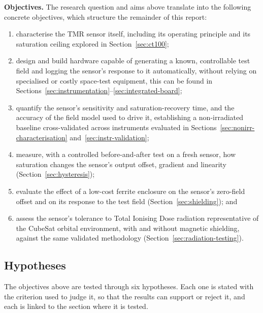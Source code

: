 \documentclass[12pt,a4paper]{article}
\begin{document}
\textbf{Objectives.} The research question and aims above translate into the following concrete objectives, which structure the remainder of this report:
\begin{enumerate}[label=(\roman*)]
\item characterise the TMR sensor itself, including its operating principle and its saturation ceiling explored in Section~\ref{sec:ct100};
\item design and build hardware capable of generating a known, controllable test field and logging the sensor's response to it automatically, without relying on specialised or costly space-test equipment, this can be found in Sections~\ref{sec:instrumentation}--\ref{sec:integrated-board};
\item quantify the sensor's sensitivity and saturation-recovery time, and the accuracy of the field model used to drive it, establishing a non-irradiated baseline cross-validated across instruments evaluated in Sections~\ref{sec:nonirr-characterisation} and~\ref{sec:instr-validation};
\item measure, with a controlled before-and-after test on a fresh sensor, how saturation changes the sensor's output offset, gradient and linearity (Section~\ref{sec:hysteresis});
\item evaluate the effect of a low-cost ferrite enclosure on the sensor's zero-field offset and on its response to the test field (Section~\ref{sec:shielding}); and
\item assess the sensor's tolerance to Total Ionising Dose radiation representative of the CubeSat orbital environment, with and without magnetic shielding, against the same validated methodology (Section~\ref{sec:radiation-testing}).
\end{enumerate}

\subsection{Hypotheses}
\label{sec:hypotheses}

The objectives above are tested through six hypotheses. Each one is stated with the criterion used to judge it, so that the results can support or reject it, and each is linked to the section where it is tested. 
\end{document}
